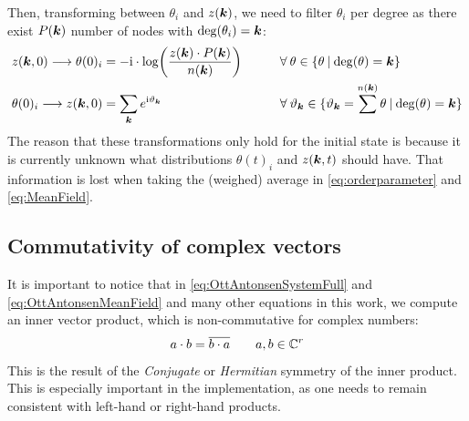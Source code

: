 Then, transforming between $\theta_i$ and $z({\boldsymbol{k}})$, we need to filter $\theta_i$ per degree as there exist $P({\boldsymbol{k}})$ number of nodes with ${\rm deg} ( \theta_i ) = {\boldsymbol{k}}$:
\begin{alignat}{2}
z(\k,0) \longrightarrow \theta(0)_i &= -\ic \cdot \log \left( \frac{z(\k)\cdot P(\k)}{n(\k)} \right) \qquad &&\forall \: \theta \in \{ \theta \: | \: \degree(\theta) = \k \}  \label{eq:ztottheta}\\
\theta(0)_i \longrightarrow z(\k,0) &= \sum_{\k} e^{\ic \vartheta_{\k}} \qquad \qquad &&\forall \: \vartheta_{\k} \in \{ \vartheta_{\k} = \sum^{n(\k)} \theta \: | \: \degree(\theta) = \k \} \label{eq:thetatoz}
\end{alignat}
The reason that these transformations only hold for the initial state is because it is currently unknown what distributions $\theta(t)_i$ and $z({\boldsymbol{k}},t)$ should have. That information is lost when taking the (weighed) average in \eqref{eq:orderparameter} and \eqref{eq:MeanField}.

\subsection{Commutativity of complex vectors} 
It is important to notice that in \eqref{eq:OttAntonsenSystemFull} and \eqref{eq:OttAntonsenMeanField} and many other equations in this work, we compute an inner vector product, which is non-commutative for complex numbers:
\begin{align}
a \cdot b = \overline{b \cdot a} \qquad a, b \in {\mathbb{C}}^r
\end{align}
This is the result of the \textsl{Conjugate} or \textsl{Hermitian} symmetry of the inner product. This is especially important in the \matlab implementation, as one needs to remain consistent with left-hand or right-hand products.


